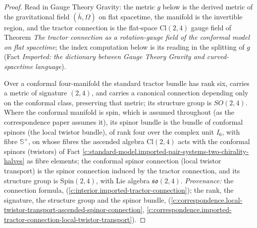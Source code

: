 \documentclass[11pt]{article}
\theoremstyle{definition}
\theoremstyle{plain}
\providecommand{\CS}{}\renewcommand{\CS}{{\mathbb{S}^{+}}}
\providecommand{\Cl}{}\renewcommand{\Cl}{\mathrm{Cl}}
\providecommand{\hb}{}\renewcommand{\hb}{\bar{h}}
\begin{document}
\begin{proof}
Read in Gauge Theory Gravity: the metric $g$ below is the derived metric of the gravitational field $(\hb, \Omega)$ on flat spacetime, the manifold is the invertible region, and the tractor connection is the flat-space $\Cl(2,4)$ gauge field of Theorem \emph{The tractor connection as a rotation-gauge field of the conformal model on flat spacetime}; the index computation below is its reading in the splitting of $g$ (Fact \emph{Imported: the dictionary between Gauge Theory Gravity and curved-spacetime language}).

Over a conformal four-manifold the standard tractor bundle has rank six, carries a metric of signature $(2,4)$, and carries a canonical connection depending only on the conformal class, preserving that metric; its structure group is $SO(2,4)$. Where the conformal manifold is spin, which is assumed throughout (as the correspondence paper assumes it), its spinor bundle is the bundle of conformal spinors (the local twistor bundle), of rank four over the complex unit $I_6$, with fibre $\CS$, on whose fibres the ascended algebra $\Cl(2,4)$ acts with the conformal spinors (twistors) of Fact \ref{c:standard-model.imported-pair-systems-two-chirality-halves} as fibre elements; the conformal spinor connection (local twistor transport) is the spinor connection induced by the tractor connection, and its structure group is $\mathrm{Spin}(2,4)$, with Lie algebra $\mathfrak{so}(2,4)$. \emph{Provenance:} the connection formula, \cite[Fact~4.1]{ButlerT6} (\ref{c:interior.imported-tractor-connection}); the rank, the signature, the structure group and the spinor bundle, \cite[Fact~4.9, Prop.~4.10]{ButlerT9} (\ref{c:correspondence.local-twistor-transport-ascended-spinor-connection}, \ref{c:correspondence.imported-tractor-connection-local-twistor-transport}).

\end{proof}
\end{document}
